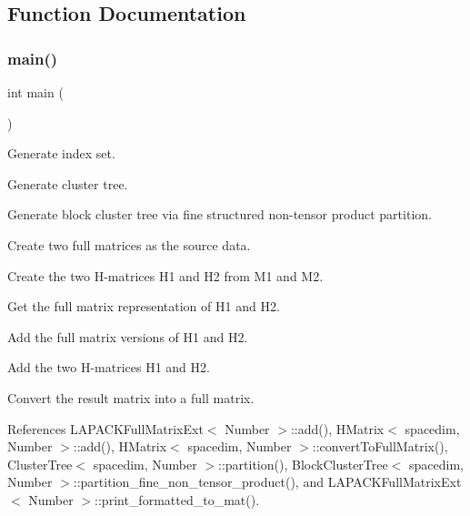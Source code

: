 \subsection{Function Documentation}
\mbox{\label{hmatrix-add-formatted_8cc_ae66f6b31b5ad750f1fe042a706a4e3d4}} 
\subsubsection{\texorpdfstring{main()}{main()}}
{\footnotesize\ttfamily int main (\begin{DoxyParamCaption}{ }\end{DoxyParamCaption})}

Generate index set.

Generate cluster tree.

Generate block cluster tree via fine structured non-\/tensor product partition.

Create two full matrices as the source data.

Create the two H-\/matrices {\ttfamily H1} and {\ttfamily H2} from {\ttfamily M1} and {\ttfamily M2}.

Get the full matrix representation of {\ttfamily H1} and {\ttfamily H2}.

Add the full matrix versions of {\ttfamily H1} and {\ttfamily H2}.

Add the two H-\/matrices {\ttfamily H1} and {\ttfamily H2}.

Convert the result matrix into a full matrix.

References L\+A\+P\+A\+C\+K\+Full\+Matrix\+Ext$<$ Number $>$\+::add(), H\+Matrix$<$ spacedim, Number $>$\+::add(), H\+Matrix$<$ spacedim, Number $>$\+::convert\+To\+Full\+Matrix(), Cluster\+Tree$<$ spacedim, Number $>$\+::partition(), Block\+Cluster\+Tree$<$ spacedim, Number $>$\+::partition\+\_\+fine\+\_\+non\+\_\+tensor\+\_\+product(), and L\+A\+P\+A\+C\+K\+Full\+Matrix\+Ext$<$ Number $>$\+::print\+\_\+formatted\+\_\+to\+\_\+mat().

